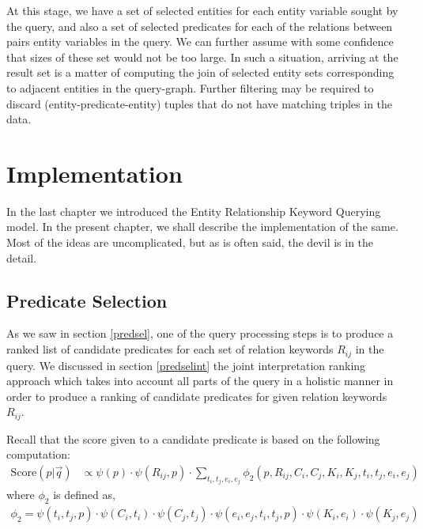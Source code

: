 \documentclass[a4paper, twoside, 12pt]{report}
\begin{document}
At this stage, we have a set of selected entities for each entity variable sought by the query, and also a set of selected predicates for each of the relations between pairs entity variables in the query. We can further assume with some confidence that sizes of these set would not be too large. In such a situation, arriving at the result set is a matter of computing the join of selected entity sets corresponding  to adjacent entities in the query-graph. Further filtering may be required to discard (entity-predicate-entity) tuples that do not have matching triples in the data.




\chapter{Implementation}

In the last chapter we introduced the Entity Relationship Keyword Querying model. In the present chapter, we shall describe the implementation of the same. Most of the ideas are uncomplicated, but as is often said, the devil is in the detail.

\section{Predicate Selection}
As we saw in section \ref{predsel}, one of the query processing steps is to produce a ranked list of candidate predicates for each set of relation keywords $R_{ij}$ in the query. We discussed in section \ref{predselint} the joint interpretation ranking approach which takes into account all parts of the query in a holistic manner in order to produce a ranking of candidate predicates for given relation keywords $R_{ij}$.

Recall that the score given to a candidate predicate is based on the following computation:
\begin{align}
\text{Score}(p|\vec{q})& \propto \psi(p) \cdot \psi(R_{ij},p) \cdot \sum_{t_i,t_j,e_i,e_j} \phi_2(p, R_{ij}, C_i, C_j, K_i, K_j, t_i, t_j, e_i, e_j) \label{eq:predsel1}
\end{align}
where $\phi_2$ is defined as,
\begin{align}
\phi_2 =  \psi(t_i,t_j,p) \cdot \psi(C_i,t_i) \cdot \psi(C_j,t_j) \cdot \psi(e_i,e_j,t_i,t_j,p) \cdot \psi(K_i,e_i) \cdot \psi(K_j,e_j) \label{eq:phi2}
\end{align}
\end{document}
